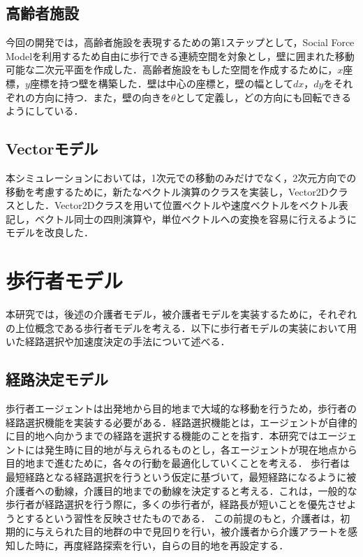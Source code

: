 \subsection{高齢者施設}

今回の開発では，高齢者施設を表現するための第1ステップとして，Social Force Modelを利用するため自由に歩行できる連続空間を対象とし，壁に囲まれた移動可能な二次元平面を作成した．高齢者施設をもした空間を作成するために，$x$座標，$y$座標を持つ壁を構築した．壁は中心の座標と，壁の幅として$dx$，$dy$をそれぞれの方向に持つ．また，壁の向きを$\theta$として定義し，どの方向にも回転できるようにしている．

\subsection{Vectorモデル}

本シミュレーションにおいては，1次元での移動のみだけでなく，2次元方向での移動を考慮するために，新たなベクトル演算のクラスを実装し，Vector2Dクラスとした．Vector2Dクラスを用いて位置ベクトルや速度ベクトルをベクトル表記し，ベクトル同士の四則演算や，単位ベクトルへの変換を容易に行えるようにモデルを改良した．

\section{歩行者モデル}

本研究では，後述の介護者モデル，被介護者モデルを実装するために，それぞれの上位概念である歩行者モデルを考える．以下に歩行者モデルの実装において用いた経路選択や加速度決定の手法について述べる．

\subsection{経路決定モデル}

歩行者エージェントは出発地から目的地まで大域的な移動を行うため，歩行者の経路選択機能を実装する必要がある．経路選択機能とは，エージェントが自律的に目的地へ向かうまでの経路を選択する機能のことを指す．本研究ではエージェントには発生時に目的地が与えられるものとし，各エージェントが現在地点から目的地まで進むために，各々の行動を最適化していくことを考える．
歩行者は最短経路となる経路選択を行うという仮定に基づいて，最短経路になるように被介護者への動線，介護目的地までの動線を決定すると考える．これは，一般的な歩行者が経路選択を行う際に，多くの歩行者が，経路長が短いことを優先させようとするという習性を反映させたものである\cite{choice_route}．
この前提のもと，介護者は，初期的に与えられた目的地群の中で見回りを行い，被介護者から介護アラートを感知した時に，再度経路探索を行い，自らの目的地を再設定する．

